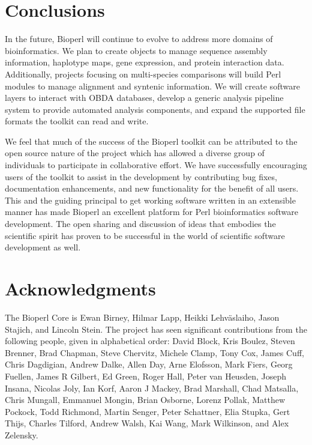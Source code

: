\documentclass[12pt]{article}
\begin{document}
\section{Conclusions}

In the future, Bioperl will continue to evolve to address more domains
of bioinformatics.  We plan to create objects to manage sequence
assembly information, haplotype maps, gene expression, and protein
interaction data.  Additionally, projects focusing on multi-species
comparisons will build Perl modules to manage alignment and syntenic
information.  We will create software layers to interact with OBDA
databases, develop a generic analysis pipeline system to provide
automated analysis components, and expand the supported file formats
the toolkit can read and write.

We feel that much of the success of the Bioperl toolkit can be
attributed to the open source nature of the project which has allowed
a diverse group of individuals to participate in collaborative effort.
We have successfully encouraging users of the toolkit to assist in the
development by contributing bug fixes, documentation enhancements, and
new functionality for the benefit of all users. This and the guiding
principal to get working software written in an extensible manner has
made Bioperl an excellent platform for Perl bioinformatics software
development.  The open sharing and discussion of ideas that embodies
the scientific spirit has proven to be successful in the world of
scientific software development as well.

\section{Acknowledgments}

The Bioperl Core is Ewan Birney, Hilmar Lapp, Heikki Lehv\"{a}slaiho,
Jason Stajich, and Lincoln Stein.  The project has seen significant
contributions from the following people, given in alphabetical order:
David Block, Kris Boulez, Steven Brenner, Brad Chapman, Steve
Chervitz, Michele Clamp, Tony Cox, James Cuff, Chris Dagdigian, Andrew
Dalke, Allen Day, Arne Elofsson, Mark Fiers, Georg Fuellen, James R
Gilbert, Ed Green, Roger Hall, Peter van Heusden, Joseph Insana,
Nicolas Joly, Ian Korf, Aaron J Mackey, Brad Marshall, Chad Matsalla,
Chris Mungall, Emmanuel Mongin, Brian Osborne, Lorenz Pollak, Matthew
Pockock, Todd Richmond, Martin Senger, Peter Schattner, Elia Stupka,
Gert Thijs, Charles Tilford, Andrew Walsh, Kai Wang, Mark Wilkinson,
and Alex Zelensky.
\end{document}
